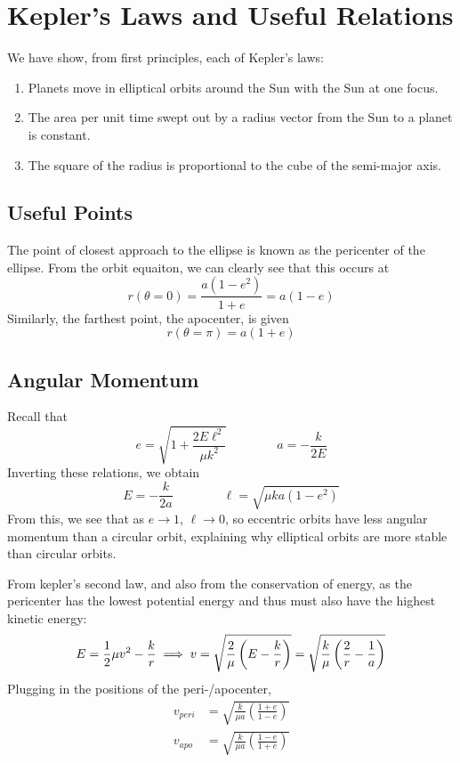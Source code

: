 \section{Kepler's Laws and Useful Relations}
We have show, from first principles, each of Kepler's laws:
\begin{enumerate}[label = \Roman*.]
	\item Planets move in elliptical orbits around the Sun with the Sun at one focus.
	\item The area per unit time swept out by a radius vector from the Sun to a planet is constant.
	\item The square of the radius is proportional to the cube of the semi-major axis.
\end{enumerate}

\subsection{Useful Points}
The point of closest approach to the ellipse is known as the pericenter of the ellipse. From the orbit equaiton, we can clearly see that this occurs at
\[r(\theta=0)=\frac{a(1-e^2)}{1+e}=a(1-e)\]
Similarly, the farthest point, the apocenter, is given
\[r(\theta=\pi)=a(1+e)\]

\subsection{Angular Momentum}
Recall that 
\[e = \sqrt{1+\frac{2E\ell^2}{\mu k^2}}\qquad\qquad a = -\frac{k}{2E}\]
Inverting these relations, we obtain
\[E = -\frac{k}{2a} \qquad\qquad \ell = \sqrt{\mu k a (1-e^2)}\]
From this, we see that as \(e\to 1\), \(\ell\to 0\), so eccentric orbits have less angular momentum than a circular orbit, explaining why elliptical orbits are more stable than circular orbits.

From kepler's second law, and also from the conservation of energy, as the pericenter has the lowest potential energy and thus must also have the highest kinetic energy:
\[E=\frac{1}{2}\mu v^2 -\frac{k}{r}\implies v=\sqrt{\frac{2}{\mu}\left(E-\frac{k}{r}\right)}=\sqrt{\frac{k}{\mu}\left(\frac{2}{r}-\frac{1}{a}\right)}\]
Plugging in the positions of the peri-/apocenter,
\begin{subequations}
	\begin{align*}
		v_{peri}&=\sqrt{\frac{k}{\mu a}\left(\frac{1+e}{1-e}\right)}\\
		v_{apo}&=\sqrt{\frac{k}{\mu a}\left(\frac{1-e}{1+e}\right)}
	\end{align*}
\end{subequations}

